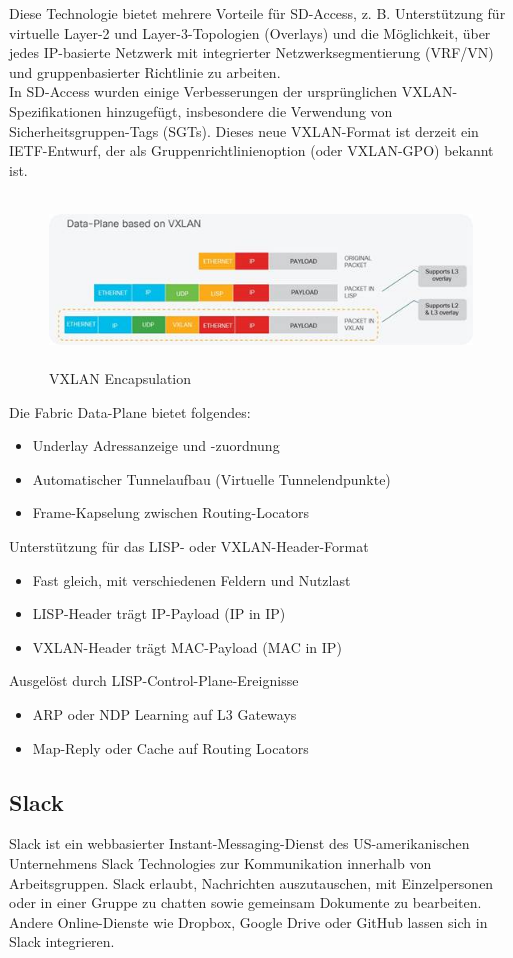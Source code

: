 Diese Technologie bietet mehrere Vorteile für SD-Access, z. B. Unterstützung für virtuelle Layer-2 und Layer-3-Topologien (Overlays) und die Möglichkeit, über jedes IP-basierte Netzwerk mit integrierter Netzwerksegmentierung (VRF/VN) und gruppenbasierter Richtlinie zu arbeiten. \\ 

In SD-Access wurden einige Verbesserungen der ursprünglichen VXLAN-Spezifikationen hinzugefügt, insbesondere die Verwendung von Sicherheitsgruppen-Tags (SGTs). Dieses neue VXLAN-Format ist derzeit ein IETF-Entwurf, der als Gruppenrichtlinienoption (oder VXLAN-GPO) bekannt ist.

\begin{figure}[H]
	\centering
	\includegraphics[height=4.5cm]{img/vxlan-encapsulation.jpg}
	\caption{VXLAN Encapsulation}
	\label{fig:VXLAN Encapsulation}
\end{figure}

Die Fabric Data-Plane bietet folgendes:
\begin{itemize}
	\item Underlay Adressanzeige und -zuordnung
	\item Automatischer Tunnelaufbau (Virtuelle Tunnelendpunkte)
	\item Frame-Kapselung zwischen Routing-Locators
\end{itemize}

Unterstützung für das LISP- oder VXLAN-Header-Format
\begin{itemize}
	\item Fast gleich, mit verschiedenen Feldern und Nutzlast
	\item LISP-Header trägt IP-Payload (IP in IP)
	\item VXLAN-Header trägt MAC-Payload (MAC in IP)
\end{itemize}

Ausgelöst durch LISP-Control-Plane-Ereignisse
\begin{itemize}
	\item ARP oder NDP Learning auf L3 Gateways
	\item Map-Reply oder Cache auf Routing Locators
\end{itemize}

\subsection{Slack}
Slack ist ein webbasierter Instant-Messaging-Dienst des US-amerikanischen Unternehmens Slack Technologies zur Kommunikation innerhalb von Arbeitsgruppen. Slack erlaubt, Nachrichten auszutauschen, mit Einzelpersonen oder in einer Gruppe zu chatten sowie gemeinsam Dokumente zu bearbeiten. Andere Online-Dienste wie Dropbox, Google Drive oder GitHub lassen sich in Slack integrieren.

